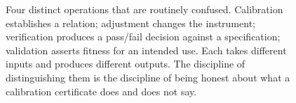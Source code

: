 \begin{figure}[htbp]
\begin{tikzpicture}[
  op/.style={draw=engblack, rounded corners=2pt, minimum width=3.5cm,
    minimum height=1.4cm, align=center, font=\small},
  arrow/.style={-{Stealth}, thick, draw=engblack!70},
]
\end{tikzpicture}
\caption[Calibration, adjustment, verification, validation]{Four
distinct operations that are routinely confused. Calibration
establishes a relation; adjustment changes the instrument;
verification produces a pass/fail decision against a specification;
validation asserts fitness for an intended use. Each takes
different inputs and produces different outputs. The discipline
of distinguishing them is the discipline of being honest about
what a calibration certificate does and does not say.}
\label{fig:vol01:ch03:cal-vs-adj}
\end{figure}
